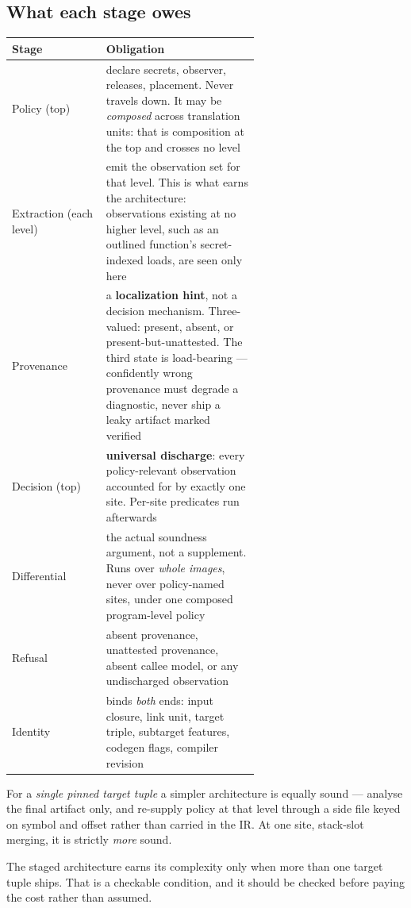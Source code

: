 \subsection{What each stage owes}

\begin{center}
\begin{tabular}{@{}l p{0.62\linewidth}@{}}
\toprule
Stage & Obligation \\
\midrule
Policy (top)
  & declare secrets, observer, releases, placement. Never travels down. It may be
    \emph{composed} across translation units: that is composition at the top and
    crosses no level \\
Extraction (each level)
  & emit the observation set for that level. This is what earns the
    architecture: observations existing at no higher level, such as an outlined
    function's secret-indexed loads, are seen only here \\
Provenance
  & a \textbf{localization hint}, not a decision mechanism. Three-valued:
    present, absent, or present-but-unattested. The third state is load-bearing
    --- confidently wrong provenance must degrade a diagnostic, never ship a
    leaky artifact marked verified \\
Decision (top)
  & \textbf{universal discharge}: every policy-relevant observation accounted for
    by exactly one site. Per-site predicates run afterwards \\
Differential
  & the actual soundness argument, not a supplement. Runs over \emph{whole
    images}, never over policy-named sites, under one composed program-level
    policy \\
Refusal
  & absent provenance, unattested provenance, absent callee model, or any
    undischarged observation \\
Identity
  & binds \emph{both} ends: input closure, link unit, target triple, subtarget
    features, codegen flags, compiler revision \\
\bottomrule
\end{tabular}
\end{center}

\begin{remark}
\label{rem:simpler}
For a \emph{single pinned target tuple} a simpler architecture is equally sound
--- analyse the final artifact only, and re-supply policy at that level through a
side file keyed on symbol and offset rather than carried in the IR. At one site,
stack-slot merging, it is strictly \emph{more} sound.

The staged architecture earns its complexity only when more than one target tuple
ships. That is a checkable condition, and it should be checked before paying the
cost rather than assumed.
\end{remark}

